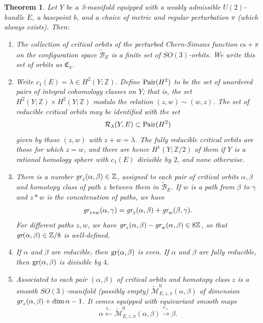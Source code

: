 \documentclass[10pt,a4paper]{amsart}
\newtheorem{theorem}{Theorem}
\theoremstyle{definition}
\theoremstyle{remark}
\numberwithin{figure}{qchap}
\begin{document}
\begin{theorem}\label{ModuliPackage}Let $Y$ be a 3-manifold equipped with a weakly admissible $U(2)$-bundle $E$, a basepoint $b$, and a choice of metric and regular perturbation $\pi$ (which always exists). Then:\begin{enumerate}
\item The collection of \emph{critical orbits} of the perturbed Chern-Simons function $\text{cs}+\pi$ on the configuration space $\widetilde{\mathcal B}_E$ is a finite set of $SO(3)$-orbits. We write this set of orbits as $\mathfrak C_\pi$.\\
\item Write $c_1(E) = \lambda \in H^2(Y; \mathbb Z)$. Define $\textup{Pair}(H^2)$ to be the set of unordered pairs of integral cohomology classes on $Y$; that is, the set $H^2(Y;\mathbb Z) \times H^2(Y;\mathbb Z)$ modulo the relation $(z,w) \sim (w,z)$. The set of reducible critical orbits may be identified with the set $$\mathcal R_\lambda(Y,E) \subset\textup{Pair}(H^2)$$ given by those $(z,w)$ with $z+w = \lambda$. The fully reducible critical orbits are those for which $z = w$, and there are hence $H^1(Y;\mathbb Z/2)$ of them if $Y$ is a rational homology sphere with $c_1(E)$ divisible by $2$, and none otherwise. \\
\item There is a number $\text{\em{gr}}_z(\alpha, \beta) \in \mathbb Z$, assigned to each pair of critical orbits $\alpha, \beta$ and homotopy class of path $z$ between them in $\widetilde{\mathcal B}_E$. If $w$ is a path from $\beta$ to $\gamma$ and $z \ast w$ is the concatenation of paths, we have $$\text{\em{gr}}_{z \ast w}(\alpha, \gamma) = \text{\em{gr}}_{z}(\alpha, \beta) + \text{\em{gr}}_{w}(\beta, \gamma).$$ For different paths $z,w$, we have $\text{\em{gr}}_z(\alpha, \beta) - \text{\em{gr}}_w(\alpha, \beta) \in 8\mathbb Z$, so that $\text{\em{gr}}(\alpha, \beta) \in \mathbb Z/8$ is well-defined.\\
\item If $\alpha$ and $\beta$ are reducible, then $\textup{gr}(\alpha, \beta)$ is even. If $\alpha$ and $\beta$ are fully reducible, then $\textup{gr}(\alpha, \beta)$ is divisible by $4$.\\
\item Associated to each pair $(\alpha, \beta)$ of critical orbits and homotopy class $z$ is a smooth $SO(3)$-manifold (possibly empty) $\widetilde{\mathcal M}^0_{E,z,\pi}(\alpha, \beta)$ of dimension $\text{\em{gr}}_{z}(\alpha, \beta)+\dim \alpha-1$. It comes equipped with equivariant smooth maps $$\alpha \xleftarrow{e_-} \widetilde{\mathcal M}^0_{E,z,\pi}(\alpha, \beta) \xrightarrow{e_+} \beta.$$

\end{enumerate}
\end{theorem}
\end{document}
